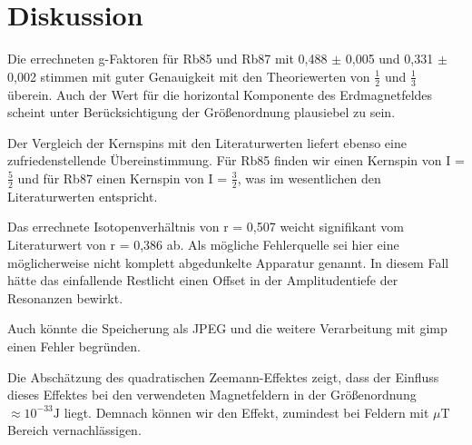 \section{Diskussion}
Die errechneten g-Faktoren für Rb85 und Rb87 mit 0,488 $\pm$ 0,005 und
0,331 $\pm$ 0,002 stimmen mit guter Genauigkeit mit den Theoriewerten von $\frac{1}{2}$ und $\frac{1}{3}$ überein.
Auch der Wert für die horizontal Komponente des Erdmagnetfeldes scheint unter Berücksichtigung der Größenordnung plausiebel zu sein.

Der Vergleich der Kernspins mit den Literaturwerten liefert ebenso eine zufriedenstellende Übereinstimmung.
Für Rb85 finden wir einen Kernspin von  I = $\frac{5}{2}$ und für Rb87 einen Kernspin von I = $\frac{3}{2}$, was im wesentlichen den
Literaturwerten entspricht.

Das errechnete Isotopenverhältnis von r = 0,507 weicht signifikant vom Literaturwert von r = 0,386 ab. Als mögliche Fehlerquelle
sei hier eine möglicherweise nicht komplett abgedunkelte Apparatur genannt. In diesem Fall hätte das einfallende Restlicht
einen Offset in der Amplitudentiefe der Resonanzen bewirkt.

Auch könnte die Speicherung als JPEG und die weitere Verarbeitung mit gimp einen Fehler begründen.

Die Abschätzung des quadratischen Zeemann-Effektes zeigt, dass der Einfluss dieses Effektes bei den verwendeten Magnetfeldern in der
Größenordnung $\approx 10^{-33} \text{J}$ liegt. Demnach können wir den Effekt, zumindest bei Feldern mit $\mu$T Bereich vernachlässigen.
